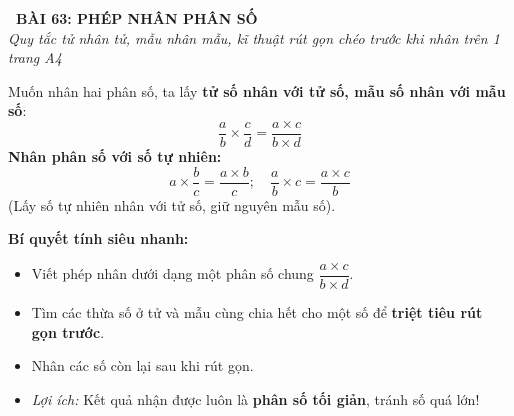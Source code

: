 \documentclass[14pt,a4paper,oneside]{extbook}
\begin{document}
\noindent
\begin{tcolorbox}[
  enhanced,
  colback=teal!8!white,
  colframe=teal!80!black,
  arc=3mm, boxrule=1pt,
  left=3mm, right=3mm, top=2mm, bottom=2mm,
  halign=center
]
  {\Large\bfseries\color{teal!90!black}\faBookmark\ BÀI 63: PHÉP NHÂN PHÂN SỐ}\\[1.5pt]
  {\footnotesize\itshape\color{black!75} Quy tắc tử nhân tử, mẫu nhân mẫu, kĩ thuật rút gọn chéo trước khi nhân trên 1 trang A4}
\end{tcolorbox}

\vspace{-2.5mm}

\noindent
\begin{minipage}[t]{0.49\textwidth}\vspace{0pt}
\begin{tcolorbox}[
  enhanced,
  colback=blue!4!white,
  colframe=blue!75!black,
  arc=2mm, boxrule=0.8pt,
  left=2mm, right=2mm, top=1.8mm, bottom=1.8mm,
  title={\footnotesize\bfseries\color{white}\faTimes\ 1. Quy tắc nhân phân số}
]
{\footnotesize
Muốn nhân hai phân số, ta lấy \textbf{tử số nhân với tử số, mẫu số nhân với mẫu số}:
$$\dfrac{a}{b} \times \dfrac{c}{d} = \dfrac{a \times c}{b \times d}$$
\textbf{Nhân phân số với số tự nhiên:}\\
$$a \times \dfrac{b}{c} = \dfrac{a \times b}{c}; \quad \dfrac{a}{b} \times c = \dfrac{a \times c}{b}$$
(Lấy số tự nhiên nhân với tử số, giữ nguyên mẫu số).
}
\end{tcolorbox}
\end{minipage}
\hfill
\begin{minipage}[t]{0.49\textwidth}\vspace{0pt}
\begin{tcolorbox}[
  enhanced,
  colback=teal!4!white,
  colframe=teal!75!black,
  arc=2mm, boxrule=0.8pt,
  left=2mm, right=2mm, top=1.8mm, bottom=1.8mm,
  title={\footnotesize\bfseries\color{white}\faCut\ 2. Kĩ thuật rút gọn trước khi nhân}
]
{\footnotesize
\textbf{Bí quyết tính siêu nhanh:}
\begin{itemize}\setlength{\itemsep}{1pt}\setlength{\leftskip}{-2.5mm}
  \item Viết phép nhân dưới dạng một phân số chung $\dfrac{a \times c}{b \times d}$.
  \item Tìm các thừa số ở tử và mẫu cùng chia hết cho một số để \textbf{triệt tiêu rút gọn trước}.
  \item Nhân các số còn lại sau khi rút gọn.
  \item \textit{Lợi ích:} Kết quả nhận được luôn là \textbf{phân số tối giản}, tránh số quá lớn!
\end{itemize}
}
\end{tcolorbox}
\end{minipage}
\end{document}
